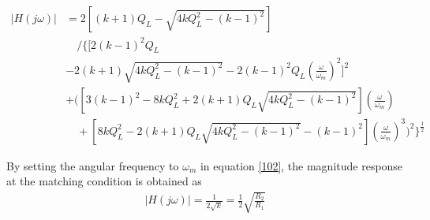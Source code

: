 \begin{equation}
    \begin{aligned}
        |H(j\omega)| &= 2\left[(k+1)Q_L-\sqrt{4kQ_L^2-(k-1)^2}\right] \\
        &\quad \bigg/ \Bigg\{\bigg[2(k-1)^2Q_L \\
        &-2(k+1)\sqrt{4kQ_L^2-(k-1)^2}-2(k-1)^2Q_L\left(\frac{\omega}{\omega_m}\right)^2\Bigg]^2 \\
        &+\Bigg(\left[3(k-1)^2 -8kQ_L^2+2(k+1)Q_L\sqrt{4kQ_L^2-(k-1)^2}\right]\left(\frac{\omega}{\omega_m}\right) \\
        &\quad+\left[8kQ_L^2-2(k+1)Q_L\sqrt{4kQ_L^2-(k-1)^2}-(k-1)^2\right]\left(\frac{\omega}{\omega_m}\right)^3\Bigg)^2
        \Bigg\}^{\frac{1}{2}}
    \end{aligned}
    \label{102}
\end{equation}


By setting the angular frequency to $\omega_m$ in equation \eqref{102}, the magnitude response at the matching condition is obtained as 
\begin{equation}
    \begin{aligned}
        |H(j\omega)|=\frac{1}{2\sqrt{k}}=\frac{1}{2}\sqrt{\frac{R_2}{R_1}}
    \end{aligned}
    \label{103}
\end{equation}

